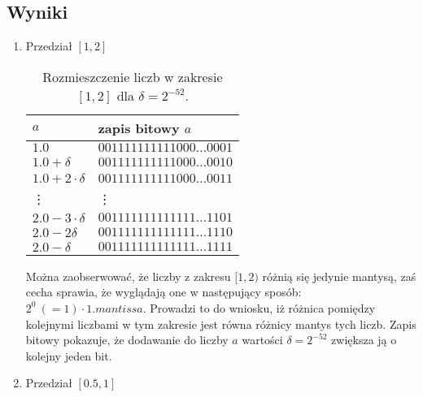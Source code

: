 \documentclass{classrep}
\begin{document}
	\subsection{Wyniki}
		\begin{enumerate}
			\item Przedział $[1,2]$
			
			\begin{table}[!h]
        		\centering
        		\footnotesize
            	\begin{tabular}{ll} \toprule
                	$a$ & {zapis bitowy $a$} \\ \midrule
                	$1.0$ & $001111111111000\dots0001$ \\ 
 					$1.0+\delta$ & $001111111111000\dots0010$ \\
 					$1.0+2\cdot\delta$ & $001111111111000\dots0011$ \\
 					\vdots & \vdots \\
 					$2.0-3
 				\cdot\delta$ & $001111111111111\dots1101$ \\
 					$2.0-2\delta$ & $001111111111111\dots1110$ \\
 					$2.0-\delta$ & $001111111111111\dots1111$ \\\bottomrule
            	\end{tabular}
            	\caption{Rozmieszczenie liczb w zakresie $[1,2]$ dla $\delta = 2^{-52}$.}
				\label{table:5}
   			\end{table}
   			Można zaobserwować, że liczby z zakresu $[1,2)$ różnią się jedynie mantysą, zaś cecha sprawia, że wyglądają one w następujący sposób:
   			$2^{0} ~(=1) \cdot 1.mantissa$. Prowadzi to do wniosku, iż różnica pomiędzy kolejnymi liczbami w tym zakresie jest równa różnicy mantys tych
   			liczb. 
   			Zapis bitowy pokazuje, że dodawanie do liczby $a$ wartości $\delta = 2^{-52}$ zwiększa ją o 
			kolejny jeden bit. 
			\newline
			
			\item Przedział $[0.5,1]$
			

\end{enumerate}
\end{document}
